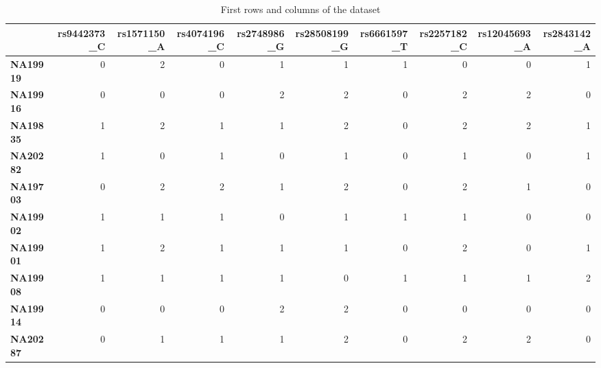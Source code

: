 \documentclass[a4paper, 11pt]{article}
\theoremstyle{definition}
\theoremstyle{remark}
\begin{document}
\begin{table}[!h]
\renewcommand{\arraystretch}{1.5}
\begin{adjustbox}{width=1\textwidth}
\begin{tabular}{lrrrrrrrrr}
\toprule
{} &  \textbf{rs9442373\_C} &  \textbf{rs1571150\_A} &  \textbf{rs4074196\_C} &  \textbf{rs2748986\_G} &  \textbf{rs28508199\_}G &  \textbf{rs6661597\_T} &  \textbf{rs2257182\_C} &  \textbf{rs12045693\_}A &  \textbf{rs2843142\_A} \\
\hline
\textbf{NA19919} &            0 &            2 &            0 &            1 &             1 &            1 &            0 &             0 &            1 \\
\textbf{NA19916} &            0 &            0 &            0 &            2 &             2 &            0 &            2 &             2 &            0 \\
\textbf{NA19835} &            1 &            2 &            1 &            1 &             2 &            0 &            2 &             2 &            1 \\
\textbf{NA20282} &            1 &            0 &            1 &            0 &             1 &            0 &            1 &             0 &            1 \\
\textbf{NA19703} &            0 &            2 &            2 &            1 &             2 &            0 &            2 &             1 &            0 \\
\textbf{NA19902} &            1 &            1 &            1 &            0 &             1 &            1 &            1 &             0 &            0 \\
\textbf{NA19901} &            1 &            2 &            1 &            1 &             1 &            0 &            2 &             0 &            1 \\
\textbf{NA19908} &            1 &            1 &            1 &            1 &             0 &            1 &            1 &             1 &            2 \\
\textbf{NA19914} &            0 &            0 &            0 &            2 &             2 &            0 &            0 &             0 &            0 \\
\textbf{NA20287} &            0 &            1 &            1 &            1 &             2 &            0 &            2 &             2 &            0 \\
\bottomrule
\end{tabular}
\end{adjustbox}
\caption{First rows and columns of the dataset}
\end{table}
\end{document}
